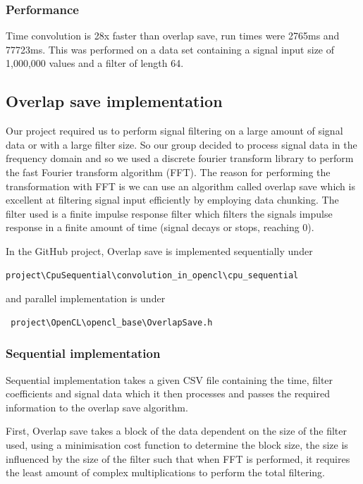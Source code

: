 \documentclass{article}
\begin{document}
\subsubsection{Performance}

Time convolution is 28x faster than overlap save, run times were 2765ms and 77723ms. This was performed on a data set containing a signal input size of 1,000,000 values and a filter of length 64.

\subsection{Overlap save implementation}

Our project required us to perform signal filtering on a large amount of signal data or with a large filter size. So our group decided to process signal data in the frequency domain and so we used a discrete fourier transform library to perform the fast Fourier transform algorithm (FFT). The reason for performing the transformation with FFT is we can use an algorithm called overlap save which is excellent at filtering signal input efficiently by employing data chunking. The filter used is a finite impulse response filter which filters the signals impulse response in a finite amount of time (signal decays or stops, reaching 0). 

In the GitHub project, Overlap save is implemented sequentially under \begin{verbatim}project\CpuSequential\convolution_in_opencl\cpu_sequential\end{verbatim} and parallel implementation is under \begin{verbatim} project\OpenCL\opencl_base\OverlapSave.h \end{verbatim}

\subsubsection{Sequential implementation}

Sequential implementation takes a given CSV file containing the time, filter coefficients and signal data which it then processes and passes the required information to the overlap save algorithm. 

First, Overlap save takes a  block of the data dependent on the size of the filter used, using a minimisation cost function to determine the block size, the size is influenced by the size of the filter such that when FFT is performed, it requires the least amount of complex multiplications to perform the total filtering.
\end{document}

